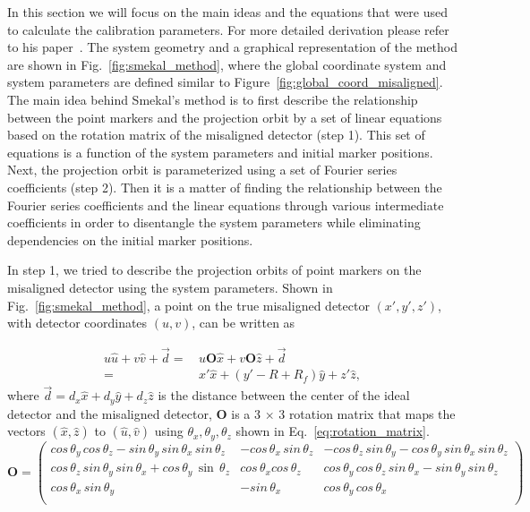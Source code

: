 In this section we will focus on the main ideas and the equations that were used to calculate the calibration parameters.  For more detailed derivation please refer to his paper~\citep{Smekal2004}.  The system geometry and a graphical representation of the method are shown in Fig.~\ref{fig:smekal_method}, where the global coordinate system and system parameters are defined similar to Figure~\ref{fig:global_coord_misaligned}. The main idea behind Smekal's method is to first describe the relationship between the point markers and the projection orbit by a set of linear equations based on the rotation matrix of the misaligned detector (step 1). This set of equations is a function of the system parameters and initial marker positions.  Next, the projection orbit is parameterized using a set of Fourier series coefficients (step 2).  Then it is a matter of finding the relationship between the Fourier series coefficients and the linear equations through various intermediate coefficients in order to disentangle the system parameters while eliminating dependencies on the initial marker positions.

In step 1, we tried to describe the projection orbits of point markers on the misaligned detector using the system parameters.  Shown in Fig.~\ref{fig:smekal_method}, a point on the true misaligned detector $(x', y', z')$, with detector coordinates $(u, v)$, can be written as

\begin{equation}
\begin{aligned}
u \hat{u} + v \hat{v} + \vec{d} =& \, u \mathrm{\mathbf{O}} \hat{x} + v \mathrm{\mathbf{O}} \hat{z} + \vec{d} \\
								=& \, x' \hat{x} + (y' - R + R_f) \hat{y} + z' \hat{z},
\end{aligned}
\label{eq:projection_orbit}
\end{equation}
where $\vec{d} = d_x \hat{x} + d_y \hat{y} + d_z \hat{z}$ is the distance between the center of the ideal detector and the misaligned detector, $\mathrm{\mathbf{O}}$ is a 3 $\times$ 3 rotation matrix that maps the vectors $(\hat{x}, \hat{z})$ to $(\hat{u}, \hat{v})$ using $\theta_x, \theta_y, \theta_z$ shown in Eq.~\ref{eq:rotation_matrix}.
\begin{equation}
\mathrm{\mathbf{O}} = 
\begin{pmatrix}
cos\, \theta_y \, cos \,\theta_z - sin \, \theta_y \, sin \, \theta_x \, sin \, \theta_z & -cos \, \theta_x \, sin \, \theta_z & -cos \, \theta_z \, sin \, \theta_y - cos \, \theta_y \, sin \, \theta_x \, sin \, \theta_z \\
cos \, \theta_z \, sin \, \theta_y \, sin \, \theta_x + cos \, \theta_y \, \sin \, \theta_z & cos \, \theta_x cos \, \theta_z & cos \, \theta_y \, cos \, \theta_z \, sin \, \theta_x - sin \, \theta_y \, sin \, \theta_z \\
cos \, \theta_x \, sin \, \theta_y & -sin \, \theta_x & cos \, \theta_y \, cos \, \theta_x \\
\end{pmatrix}
\label{eq:rotation_matrix}
\end{equation}

